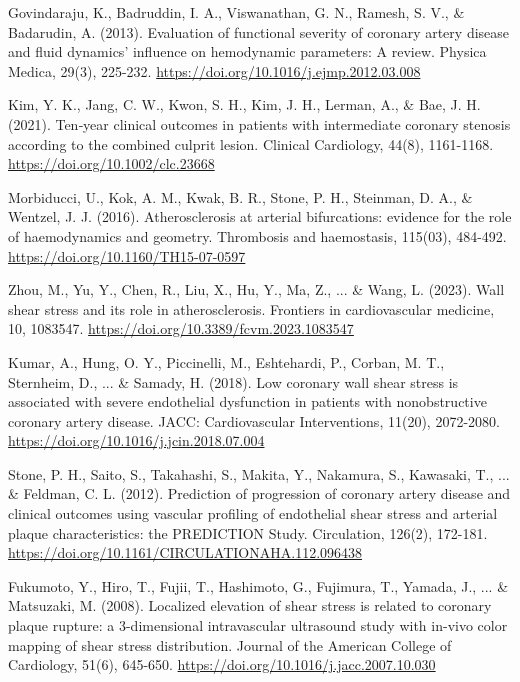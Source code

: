 ﻿\documentclass[12pt,a4paper]{article}
\theoremstyle{definition}
\numberwithin{equation}{section}
\begin{document}
\begin{thebibliography}{}
 Govindaraju, K., Badruddin, I. A., Viswanathan, G. N., Ramesh, S. V., \& Badarudin, A. (2013). Evaluation of functional severity of coronary artery disease and fluid dynamics' influence on hemodynamic parameters: A review. Physica Medica, 29(3), 225-232. \url{https://doi.org/10.1016/j.ejmp.2012.03.008}

 Kim, Y. K., Jang, C. W., Kwon, S. H., Kim, J. H., Lerman, A., \& Bae, J. H. (2021). Ten‐year clinical outcomes in patients with intermediate coronary stenosis according to the combined culprit lesion. Clinical Cardiology, 44(8), 1161-1168. \url{https://doi.org/10.1002/clc.23668}

 Morbiducci, U., Kok, A. M., Kwak, B. R., Stone, P. H., Steinman, D. A., \& Wentzel, J. J. (2016). Atherosclerosis at arterial bifurcations: evidence for the role of haemodynamics and geometry. Thrombosis and haemostasis, 115(03), 484-492. \url{https://doi.org/10.1160/TH15-07-0597}

 Zhou, M., Yu, Y., Chen, R., Liu, X., Hu, Y., Ma, Z., ... \& Wang, L. (2023). Wall shear stress and its role in atherosclerosis. Frontiers in cardiovascular medicine, 10, 1083547. \url{https://doi.org/10.3389/fcvm.2023.1083547}

 Kumar, A., Hung, O. Y., Piccinelli, M., Eshtehardi, P., Corban, M. T., Sternheim, D., ... \& Samady, H. (2018). Low coronary wall shear stress is associated with severe endothelial dysfunction in patients with nonobstructive coronary artery disease. JACC: Cardiovascular Interventions, 11(20), 2072-2080. \url{https://doi.org/10.1016/j.jcin.2018.07.004}

 Stone, P. H., Saito, S., Takahashi, S., Makita, Y., Nakamura, S., Kawasaki, T., ... \& Feldman, C. L. (2012). Prediction of progression of coronary artery disease and clinical outcomes using vascular profiling of endothelial shear stress and arterial plaque characteristics: the PREDICTION Study. Circulation, 126(2), 172-181. \url{https://doi.org/10.1161/CIRCULATIONAHA.112.096438}

 Fukumoto, Y., Hiro, T., Fujii, T., Hashimoto, G., Fujimura, T., Yamada, J., ... \& Matsuzaki, M. (2008). Localized elevation of shear stress is related to coronary plaque rupture: a 3-dimensional intravascular ultrasound study with in-vivo color mapping of shear stress distribution. Journal of the American College of Cardiology, 51(6), 645-650. \url{https://doi.org/10.1016/j.jacc.2007.10.030}


\end{thebibliography}
\end{document}
